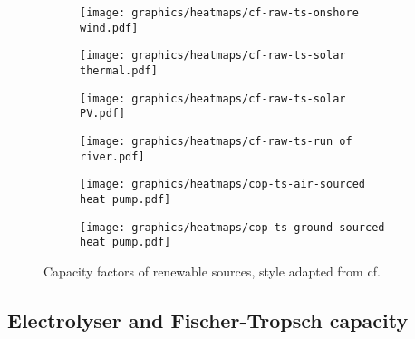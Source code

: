 



\clearpage
\begin{figure}
    \centering
        \begin{subfigure}[h]{0.49\textwidth}
            \centering
        \texttt{[image: graphics/heatmaps/cf-raw-ts-onshore wind.pdf]}
    \end{subfigure}
    \begin{subfigure}[h]{0.49\textwidth}
        \centering
        \texttt{[image: graphics/heatmaps/cf-raw-ts-solar thermal.pdf]}
    \end{subfigure}
    \begin{subfigure}[h]{0.49\textwidth}
        \centering
        \texttt{[image: graphics/heatmaps/cf-raw-ts-solar PV.pdf]}
    \end{subfigure}
    \begin{subfigure}[h]{0.49\textwidth}
        \centering
        \texttt{[image: graphics/heatmaps/cf-raw-ts-run of river.pdf]}
    \end{subfigure}
    \begin{subfigure}[h]{0.49\textwidth}
        \centering
        \texttt{[image: graphics/heatmaps/cop-ts-air-sourced heat pump.pdf]}
    \end{subfigure}
    \begin{subfigure}[h]{0.49\textwidth}
        \centering
        \texttt{[image: graphics/heatmaps/cop-ts-ground-sourced heat pump.pdf]}
    \end{subfigure}
    \caption{Capacity factors of renewable sources, style adapted from cf. \cite{Neumann2022}}
    \label{fig:ren-cfs}
\end{figure}



\subsection{Electrolyser and Fischer-Tropsch capacity}



